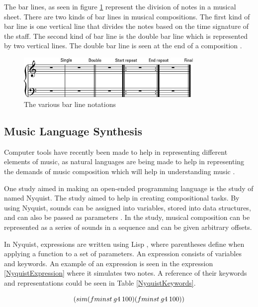 The bar lines, as seen in figure \ref{fig:Bar-Lines} represent the division of notes in a musical sheet. There are two kinds of bar lines in musical compositions. The first kind of bar line is one vertical line that divides the notes based on the time signature of the staff. The second kind of bar line is the double bar line which is represented by two vertical lines. The double bar line is seen at the end of a composition \cite{read1964music}.  

\begin{figure}[H]
    \centering
    \includegraphics[width=9cm ]{figures/Bar-Lines.jpg}
    \caption{The various bar line notations \protect\cite{Bar-Lines}}
    \label{fig:Bar-Lines}
\end{figure}

\subsection{Music Language Synthesis}
Computer tools have recently been made to help in representing different elements of music, as natural languages are being made to help in representing the demands of music composition which will help in understanding music \cite{loy1985programming}.
\newline

One study aimed in making an open-ended programming language is the study of  named Nyquist. The study aimed to help in creating compositional tasks. By using Nyquist, sounds can be assigned into variables, stored into data structures, and can also be passed as parameters \cite{dannenberg1997machine}. In the study, musical composition can be represented as a series of sounds in a sequence and can be given arbitrary offsets. 

In Nyquist, expressions are written using Lisp \cite{turetsky1984lisp}, where parentheses define when applying a function to a set of parameters. An expression consists of variables and keywords. An example of an expression is seen in the expression \ref{NyquistExpression} where it simulates two notes. A reference of their keywords and representations could be seen in Table \ref{NyquistKeywords}.

\begin{equation}
          (sim (fminst\: g4\: 100) \\
        (fminst\: g4\: 100))
    \label{NyquistExpression}
\end{equation}


